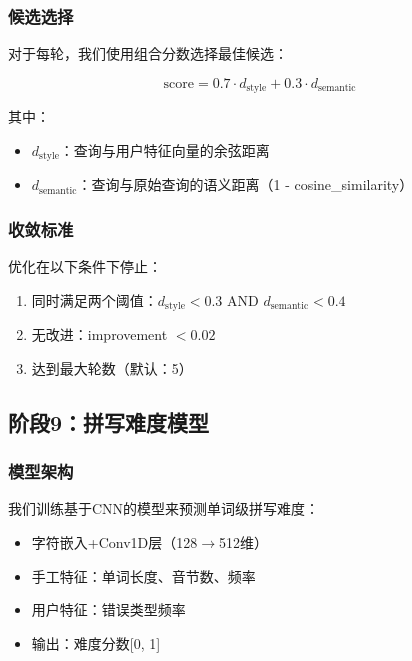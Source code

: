 \documentclass[11pt,a4paper]{article}
\begin{document}
\subsubsection{候选选择}

对于每轮，我们使用组合分数选择最佳候选：

\begin{equation}
\text{score} = 0.7 \cdot d_{\text{style}} + 0.3 \cdot d_{\text{semantic}}
\end{equation}

其中：
\begin{itemize}
    \item $d_{\text{style}}$：查询与用户特征向量的余弦距离
    \item $d_{\text{semantic}}$：查询与原始查询的语义距离（1 - cosine\_similarity）
\end{itemize}

\subsubsection{收敛标准}

优化在以下条件下停止：
\begin{enumerate}
    \item 同时满足两个阈值：$d_{\text{style}} < 0.3$ AND $d_{\text{semantic}} < 0.4$
    \item 无改进：improvement $< 0.02$
    \item 达到最大轮数（默认：5）
\end{enumerate}

\subsection{阶段9：拼写难度模型}

\subsubsection{模型架构}

我们训练基于CNN的模型来预测单词级拼写难度：

\begin{itemize}
    \item 字符嵌入+Conv1D层（128$\rightarrow$512维）
    \item 手工特征：单词长度、音节数、频率
    \item 用户特征：错误类型频率
    \item 输出：难度分数[0, 1]
\end{itemize}
\end{document}
